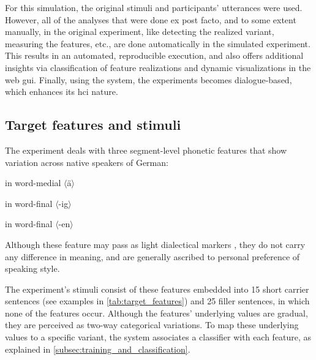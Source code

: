 For this simulation, the original stimuli and participants' utterances were used.
However, all of the analyses that were done ex post facto, and to some extent manually, in the original experiment, like detecting the realized variant, measuring the features, etc., are done automatically in the simulated experiment.
This results in an automated, reproducible execution, and also offers additional insights via classification of feature realizations and dynamic visualizations in the web \ac{gui}.
Finally, using the system, the experiments becomes dialogue-based, which enhances its \ac{hci} nature.

\subsection{Target features and stimuli}
\label{subsec:target_features_and_stimuli}

The experiment deals with three segment-level phonetic features that show variation across native speakers of German:

\begin{description}[labelindent=1.3cm, labelwidth=\widthof{\quad \textipa{[I\c{c}]}~vs.~\textipa{[Ik]}}]
	\item [\textipa{[E:]}~vs.~\textipa{[e:]}] in word-medial $\langle$ä$\rangle$
	\item [\textipa{[I\c{c}]}~vs.~\textipa{[Ik]}] in word-final $\langle$-ig$\rangle$
	\item [\textipa{[\s{n}]}~vs.~\textipa{[@n]}] in word-final $\langle$-en$\rangle$
\end{description}

\noindent
Although these feature may pass as light dialectical markers \citep{Mitterer2013regional}, they do not carry any difference in meaning, and are generally ascribed to personal preference of speaking style.

The experiment's stimuli consist of these features embedded into 15 short carrier sentences (see examples in \cref{tab:target_features}) and 25 filler sentences, in which none of the features occur.
Although the features' underlying values are gradual, they are perceived as two-way categorical variations.
To map these underlying values to a specific variant, the system associates a classifier with each feature, as explained in \cref{subsec:training_and_classification}.

